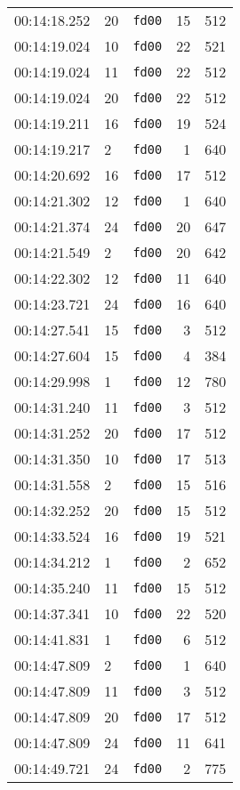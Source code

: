 \documentclass{article}
\begin{document}
\begin{longtable}{lllrr}
00:14:18.252 & 20 & \texttt{fd00} & 15 & 512 \\
00:14:19.024 & 10 & \texttt{fd00} & 22 & 521 \\
00:14:19.024 & 11 & \texttt{fd00} & 22 & 512 \\
00:14:19.024 & 20 & \texttt{fd00} & 22 & 512 \\
00:14:19.211 & 16 & \texttt{fd00} & 19 & 524 \\
00:14:19.217 & 2 & \texttt{fd00} & 1 & 640 \\
00:14:20.692 & 16 & \texttt{fd00} & 17 & 512 \\
00:14:21.302 & 12 & \texttt{fd00} & 1 & 640 \\
00:14:21.374 & 24 & \texttt{fd00} & 20 & 647 \\
00:14:21.549 & 2 & \texttt{fd00} & 20 & 642 \\
00:14:22.302 & 12 & \texttt{fd00} & 11 & 640 \\
00:14:23.721 & 24 & \texttt{fd00} & 16 & 640 \\
00:14:27.541 & 15 & \texttt{fd00} & 3 & 512 \\
00:14:27.604 & 15 & \texttt{fd00} & 4 & 384 \\
00:14:29.998 & 1 & \texttt{fd00} & 12 & 780 \\
00:14:31.240 & 11 & \texttt{fd00} & 3 & 512 \\
00:14:31.252 & 20 & \texttt{fd00} & 17 & 512 \\
00:14:31.350 & 10 & \texttt{fd00} & 17 & 513 \\
00:14:31.558 & 2 & \texttt{fd00} & 15 & 516 \\
00:14:32.252 & 20 & \texttt{fd00} & 15 & 512 \\
00:14:33.524 & 16 & \texttt{fd00} & 19 & 521 \\
00:14:34.212 & 1 & \texttt{fd00} & 2 & 652 \\
00:14:35.240 & 11 & \texttt{fd00} & 15 & 512 \\
00:14:37.341 & 10 & \texttt{fd00} & 22 & 520 \\
00:14:41.831 & 1 & \texttt{fd00} & 6 & 512 \\
00:14:47.809 & 2 & \texttt{fd00} & 1 & 640 \\
00:14:47.809 & 11 & \texttt{fd00} & 3 & 512 \\
00:14:47.809 & 20 & \texttt{fd00} & 17 & 512 \\
00:14:47.809 & 24 & \texttt{fd00} & 11 & 641 \\
00:14:49.721 & 24 & \texttt{fd00} & 2 & 775 \\

\end{longtable}
\end{document}
